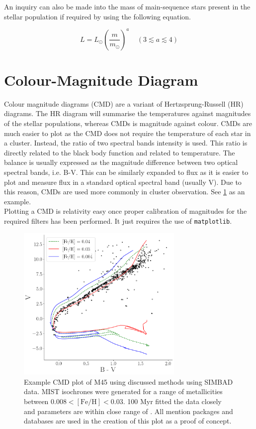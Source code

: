 An inquiry can also be made into the mass of main-sequence stars present in the stellar population if required by using the following equation. 

\begin{equation}
    L = L_\odot \left( \frac{m}{m_\odot}\right)^a \; \; \; \; (3 \lesssim a \lesssim 4) 
\end{equation}




\section{Colour-Magnitude Diagram} \label{sec: CMD-diagram}

Colour magnitude diagrams (CMD) are a variant of Hertzsprung-Russell (HR) diagrams. The HR diagram will summarise the temperatures against magnitudes of the stellar populations, whereas CMDs is magnitude against colour. CMDs are much easier to plot as the CMD does not require the temperature of each star in a cluster. Instead, the ratio of two spectral bands intensity is used. This ratio is directly related to the black body function and related to temperature. The balance is usually expressed as the magnitude difference between two optical spectral bands, i.e. B-V. This can be similarly expanded to flux as it is easier to plot and measure flux in a standard optical spectral band (usually V). Due to this reason, CMDs are used more commonly in cluster observation. See \cref{fig: CMD_plot} as an example. \\ 
Plotting a CMD is relativity easy once proper calibration of magnitudes for the required filters has been performed. It just requires the use of \verb|matplotlib|.  

\begin{figure}
    \centering
    \includegraphics[width = 8cm]{figures/M45CMD.png}
    \caption{Example CMD plot of M45 using discussed methods using SIMBAD data. MIST isochrones were generated for a range of metallicities between $0.008 < [\text{Fe/H}] < 0.03$. 100 Myr fitted the data closely and parameters are within close range of \cite{1985_Vandenberg}. All mention packages and databases are used in the creation of this plot as a proof of concept.}
    \label{fig: CMD_plot}
\end{figure}

